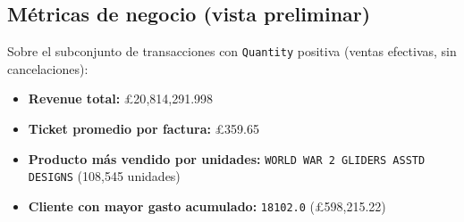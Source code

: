 \subsection{Métricas de negocio (vista preliminar)}

Sobre el subconjunto de transacciones con \texttt{Quantity} positiva (ventas efectivas, sin cancelaciones):

\begin{itemize}
    \item \textbf{Revenue total:} £20{,}814{,}291.998
    \item \textbf{Ticket promedio por factura:} £359.65
    \item \textbf{Producto más vendido por unidades:} \texttt{WORLD WAR 2 GLIDERS ASSTD DESIGNS} (108{,}545 unidades)
    \item \textbf{Cliente con mayor gasto acumulado:} \texttt{18102.0} (£598{,}215.22)
\end{itemize}
